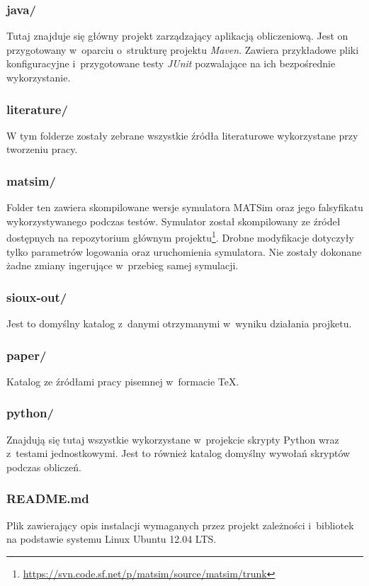 \documentclass[twoside,12pt]{report}
\begin{document}
\subsubsection{java/}
Tutaj znajduje się główny projekt zarządzający aplikacją obliczeniową. Jest on przygotowany w~oparciu o~strukturę projektu \textit{Maven}. Zawiera przykładowe pliki konfiguracyjne i~przygotowane testy \textit{JUnit} pozwalające na ich bezpośrednie wykorzystanie.

\subsubsection{literature/}
W tym folderze zostały zebrane wszystkie źródła literaturowe wykorzystane przy tworzeniu pracy.

\subsubsection{matsim/}
Folder ten zawiera skompilowane wersje symulatora MATSim oraz jego falsyfikatu wykorzystywanego podczas testów. Symulator został skompilowany ze źródeł dostępnych na repozytorium głównym projektu\footnote {\url{https://svn.code.sf.net/p/matsim/source/matsim/trunk}}. Drobne modyfikacje dotyczyły tylko parametrów logowania oraz uruchomienia symulatora. Nie zostały dokonane żadne zmiany ingerujące w~przebieg samej symulacji.

\subsubsection{sioux-out/}
Jest to domyślny katalog z~danymi otrzymanymi w~wyniku działania projketu.

\subsubsection{paper/}
Katalog ze źródłami pracy pisemnej w~formacie TeX.

\subsubsection{python/}
Znajdują się tutaj wszystkie wykorzystane w~projekcie skrypty Python wraz z~testami jednostkowymi. Jest to również katalog domyślny wywołań skryptów podczas obliczeń.

\subsubsection{README.md}
Plik zawierający opis instalacji wymaganych przez projekt zależności i~bibliotek na podstawie systemu Linux Ubuntu 12.04 LTS.
\end{document}
